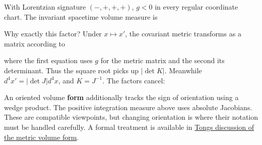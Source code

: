 \documentclass[
  11pt,
  letterpaper,
  oneside,
  openany]{scrbook}
\begin{document}
\begin{center}
\begingroup
{}
\ifdim\wd\grmathbox>\linewidth
\resizebox{\linewidth}{!}{\usebox{\grmathbox}}
\else\usebox{\grmathbox}\fi
\endgroup
\end{center}

With Lorentzian signature \((-,+,+,+)\), \(g<0\) in every regular
coordinate chart. The invariant spacetime volume measure is

\begin{center}
\begingroup
{}
\ifdim\wd\grmathbox>\linewidth
\resizebox{\linewidth}{!}{\usebox{\grmathbox}}
\else\usebox{\grmathbox}\fi
\endgroup
\end{center}

Why exactly this factor? Under \(x\mapsto x'\), the covariant metric
transforms as a matrix according to

\begin{center}
\begingroup
{}
\ifdim\wd\grmathbox>\linewidth
\resizebox{\linewidth}{!}{\usebox{\grmathbox}}
\else\usebox{\grmathbox}\fi
\endgroup
\end{center}

where the first equation uses \(g\) for the metric matrix and the second
its determinant. Thus the square root picks up \(|\det K|\). Meanwhile
\(d^4x'=|\det J|d^4x\), and \(K=J^{-1}\). The factors cancel:

\begin{center}
\begingroup
{}
\ifdim\wd\grmathbox>\linewidth
\resizebox{\linewidth}{!}{\usebox{\grmathbox}}
\else\usebox{\grmathbox}\fi
\endgroup
\end{center}

An oriented volume \textbf{form} additionally tracks the sign of
orientation using a wedge product. The positive integration measure
above uses absolute Jacobians. These are compatible viewpoints, but
changing orientation is where their notation must be handled carefully.
A formal treatment is available in
\href{https://davidtong.org/pdfs/teaching/general-relativity/gr3.pdf}{Tong\textquotesingle s
discussion of the metric volume form}.
\end{document}
